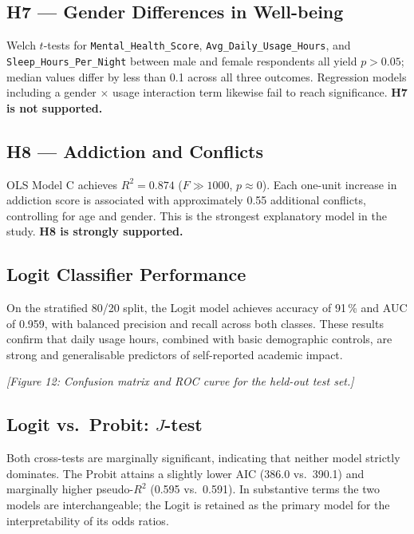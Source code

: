 \documentclass[10pt]{article}
\begin{document}
\subsection{H7 --- Gender Differences in Well-being}

Welch $t$-tests for \texttt{Mental\_Health\_Score},
\texttt{Avg\_Daily\_Usage\_Hours}, and \texttt{Sleep\_Hours\_Per\_Night} between
male and female respondents all yield $p > 0.05$; median values differ by less
than 0.1 across all three outcomes. Regression models including a gender
$\times$ usage interaction term likewise fail to reach significance.
\textbf{H7 is not supported.}

\subsection{H8 --- Addiction and Conflicts}

OLS Model C achieves $R^2 = 0.874$ ($F \gg 1000$, $p \approx 0$). Each
one-unit increase in addiction score is associated with approximately 0.55
additional conflicts, controlling for age and gender. This is the strongest
explanatory model in the study. \textbf{H8 is strongly supported.}

\subsection{Logit Classifier Performance}

On the stratified 80/20 split, the Logit model achieves accuracy of 91\,\%
and AUC of 0.959, with balanced precision and recall across both classes.
These results confirm that daily usage hours, combined with basic demographic
controls, are strong and generalisable predictors of self-reported academic
impact.

\textit{[Figure 12: Confusion matrix and ROC curve for the held-out test set.]}

\subsection{Logit vs.\ Probit: $J$-test}

Both cross-tests are marginally significant, indicating that neither model
strictly dominates. The Probit attains a slightly lower AIC (386.0 vs.\ 390.1)
and marginally higher pseudo-$R^2$ (0.595 vs.\ 0.591). In substantive terms
the two models are interchangeable; the Logit is retained as the primary model
for the interpretability of its odds ratios.
\end{document}
